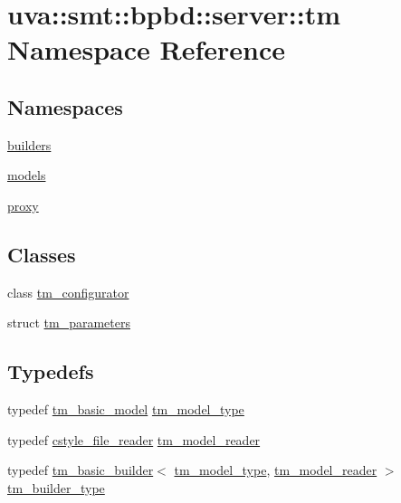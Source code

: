\hypertarget{namespaceuva_1_1smt_1_1bpbd_1_1server_1_1tm}{}\section{uva\+:\+:smt\+:\+:bpbd\+:\+:server\+:\+:tm Namespace Reference}
\label{namespaceuva_1_1smt_1_1bpbd_1_1server_1_1tm}
\subsection*{Namespaces}
\begin{DoxyCompactItemize}
\item 
 \hyperlink{namespaceuva_1_1smt_1_1bpbd_1_1server_1_1tm_1_1builders}{builders}
\item 
 \hyperlink{namespaceuva_1_1smt_1_1bpbd_1_1server_1_1tm_1_1models}{models}
\item 
 \hyperlink{namespaceuva_1_1smt_1_1bpbd_1_1server_1_1tm_1_1proxy}{proxy}
\end{DoxyCompactItemize}
\subsection*{Classes}
\begin{DoxyCompactItemize}
\item 
class \hyperlink{classuva_1_1smt_1_1bpbd_1_1server_1_1tm_1_1tm__configurator}{tm\+\_\+configurator}
\item 
struct \hyperlink{structuva_1_1smt_1_1bpbd_1_1server_1_1tm_1_1tm__parameters}{tm\+\_\+parameters}
\end{DoxyCompactItemize}
\subsection*{Typedefs}
\begin{DoxyCompactItemize}
\item 
typedef \hyperlink{classuva_1_1smt_1_1bpbd_1_1server_1_1tm_1_1models_1_1tm__basic__model}{tm\+\_\+basic\+\_\+model} \hyperlink{namespaceuva_1_1smt_1_1bpbd_1_1server_1_1tm_a2f41d3b9fcee3dddc005fd7e7deae402}{tm\+\_\+model\+\_\+type}
\item 
typedef \hyperlink{classuva_1_1utils_1_1file_1_1cstyle__file__reader}{cstyle\+\_\+file\+\_\+reader} \hyperlink{namespaceuva_1_1smt_1_1bpbd_1_1server_1_1tm_a252830a0bbad1555180821ed6ffce83f}{tm\+\_\+model\+\_\+reader}
\item 
typedef \hyperlink{classuva_1_1smt_1_1bpbd_1_1server_1_1tm_1_1builders_1_1tm__basic__builder}{tm\+\_\+basic\+\_\+builder}$<$ \hyperlink{namespaceuva_1_1smt_1_1bpbd_1_1server_1_1tm_a2f41d3b9fcee3dddc005fd7e7deae402}{tm\+\_\+model\+\_\+type}, \hyperlink{namespaceuva_1_1smt_1_1bpbd_1_1server_1_1tm_a252830a0bbad1555180821ed6ffce83f}{tm\+\_\+model\+\_\+reader} $>$ \hyperlink{namespaceuva_1_1smt_1_1bpbd_1_1server_1_1tm_a29c513cbd5b9a3c3838ad34e5103776f}{tm\+\_\+builder\+\_\+type}
\end{DoxyCompactItemize}


